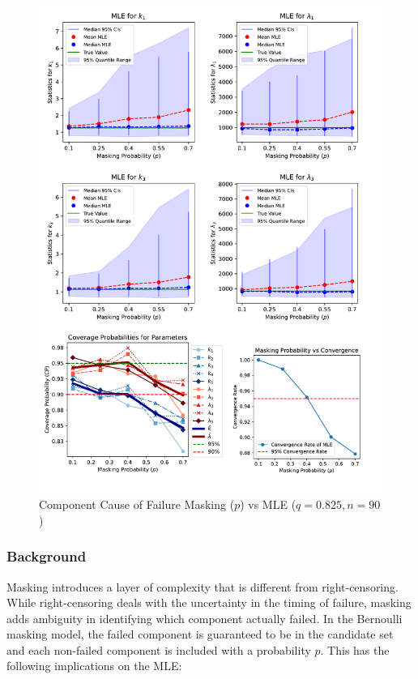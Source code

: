 \documentclass[
]{article}
\theoremstyle{definition}
\theoremstyle{plain}
\theoremstyle{definition}
\theoremstyle{definition}
\theoremstyle{definition}
\theoremstyle{definition}
\theoremstyle{remark}
\begin{document}
\begin{figure}

{\centering \includegraphics{image/5_system_prob_fig} 

}

\caption{Component Cause of Failure Masking ($p$) vs MLE ($q = 0.825, n = 90$)}\label{fig:masking-prob-vs-stats}
\end{figure}

\hypertarget{background-1}{%
\subsubsection{Background}\label{background-1}}

Masking introduces a layer of complexity that is different from right-censoring.
While right-censoring deals with the uncertainty in the timing of failure,
masking adds ambiguity in identifying which component actually failed. In the
Bernoulli masking model, the failed component is guaranteed to be in the
candidate set and each non-failed component is included with a probability \(p\).
This has the following implications on the MLE:
\end{document}
